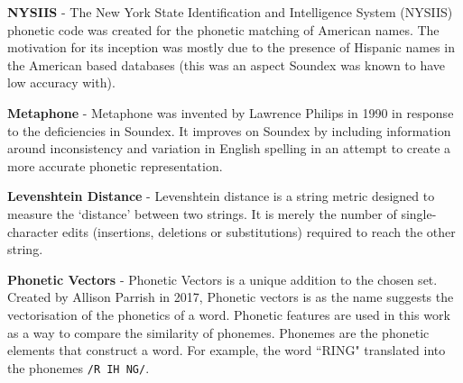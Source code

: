 \textbf{NYSIIS} - The New York State Identification and Intelligence System (NYSIIS) phonetic code was created for the phonetic matching of American names. The motivation for its inception was mostly due to the presence of Hispanic names in the American based databases (this was an aspect Soundex was known to have low accuracy with).

\textbf{Metaphone} - Metaphone was invented by Lawrence Philips in 1990\cite{philips1990hanging} in response to the deficiencies in Soundex. It improves on Soundex by including information around inconsistency and variation in English spelling in an attempt to create a more accurate phonetic representation.

\textbf{Levenshtein Distance} - Levenshtein distance is a string metric designed to measure the `distance' between two strings. It is merely the number of single-character edits (insertions, deletions or substitutions) required to reach the other string.

\textbf{Phonetic Vectors} - Phonetic Vectors is a unique addition to the chosen set. Created by Allison Parrish in 2017\cite{parrish2017poetic}, Phonetic vectors is as the name suggests the vectorisation of the phonetics of a word. Phonetic features are used in this work as a way to compare the similarity of phonemes. Phonemes are the phonetic elements that construct a word. For example, the word ``RING" translated into the phonemes \verb|/R IH NG/|. 




